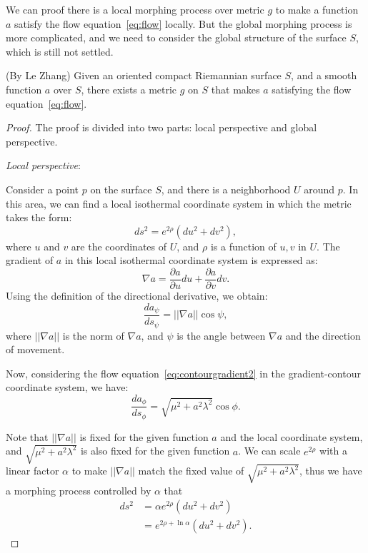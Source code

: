 We can proof there is a local morphing process over metric $g$ to make a function $a$ satisfy the flow equation~\eqref{eq:flow} locally.
But the global morphing process is more complicated, and we need to consider the global structure of the surface $S$, which is still not settled.

\begin{lemma}(By Le Zhang)
    Given an oriented compact Riemannian surface $S$, and a smooth function $a$ over $S$, there exists a metric $g$ on $S$ that makes $a$
    satisfying the flow equation~\eqref{eq:flow}.
    \label{prop:existence2nd}
\end{lemma}

\begin{proof}

    The proof is divided into two parts: local perspective and global perspective.

    \emph{Local perspective}:

    Consider a point \( p \) on the surface \( S \), and there is a neighborhood \( U \) around \( p \).
    In this area, we can find a local isothermal coordinate system in which the metric takes the form:
    \[ ds^2 = e^{2\rho}(du^2 + dv^2), \]
    where \( u \) and \( v \) are the coordinates of \( U \), and \( \rho \) is a function of \( u, v \) in \( U \).
    The gradient of \( a \) in this local isothermal coordinate system is expressed as:
    \[ \nabla a = \frac{\partial a}{\partial u} du + \frac{\partial a}{\partial v} dv. \]
    Using the definition of the directional derivative, we obtain:
    \[ \frac{da_{\psi}}{ds_{\psi}} = ||\nabla a|| \cos \psi, \]
    where \( ||\nabla a|| \) is the norm of \( \nabla a \), and \( \psi \) is the angle between \( \nabla a \) and the direction of movement.

    Now, considering the flow equation~\ref{eq:contourgradient2} in the gradient-contour coordinate system, we have:
    \[ \frac{da_{\phi}}{ds_{\phi}} = \sqrt{\mu^2 + a^2 \lambda^2} \cos \phi. \]

    Note that \( ||\nabla a|| \) is fixed for the given function \( a \) and the local coordinate system, and \( \sqrt{\mu^2 + a^2 \lambda^2} \) is also fixed for the given function \( a \).
    We can scale \( e^{2\rho} \) with a linear factor \( \alpha \) to make \( ||\nabla a|| \) match the fixed value of \( \sqrt{\mu^2 + a^2 \lambda^2} \),
    thus we have a morphing process controlled by \( \alpha \) that
    \begin{align}
    ds^2 &= \alpha e^{2 \rho}(du^2 + dv^2)\label{eq:morphing} \\
         &= e^{2 \rho + \ln \alpha}(du^2 + dv^2).
    \end{align}


\end{proof}
